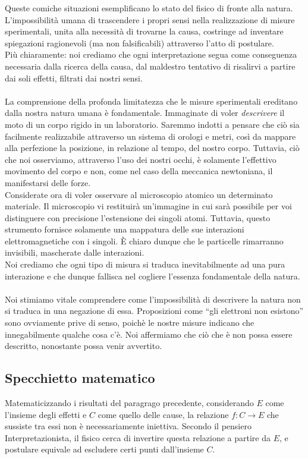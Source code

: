 \documentclass[]{article}
\begin{document}
	Queste comiche situazioni esemplificano lo stato del fisico di fronte alla natura. L'impossibilità umana di trascendere i propri sensi nella realizzazione di misure sperimentali, unita alla necessità di trovarne la causa, costringe ad inventare spiegazioni ragionevoli (ma non falsificabili) attraverso l'atto di postulare. \\
	Più chiaramente: noi crediamo che ogni interpretazione segua come conseguenza necessaria dalla ricerca della causa, dal maldestro tentativo di risalirvi a partire dai soli effetti, filtrati dai nostri sensi.\\
	\\
	La comprensione della profonda limitatezza che le misure sperimentali ereditano dalla nostra natura umana è fondamentale. Immaginate di voler \textit{descrivere} il moto di un corpo rigido in un laboratorio. Saremmo indotti a pensare che ciò sia facilmente realizzabile attraverso un sistema di orologi e metri, così da mappare alla perfezione la posizione, in relazione al tempo, del nostro corpo. Tuttavia, ciò che noi osserviamo, attraverso l'uso dei nostri occhi, è solamente l'effettivo movimento del corpo e non, come nel caso della meccanica newtoniana, il manifestarsi delle forze. \\
	Considerate ora di voler osservare al microscopio atomico un determinato materiale. Il microscopio vi restituirà un'immagine in cui sarà possibile per voi distinguere con precisione l'estensione dei singoli atomi. Tuttavia, questo strumento fornisce solamente una mappatura delle sue interazioni elettromagnetiche con i singoli. \`E chiaro dunque che  le particelle rimarranno invisibili, mascherate dalle interazioni.\\
	Noi crediamo che ogni tipo di misura si traduca inevitabilmente ad una pura interazione e che dunque fallisca nel cogliere l'essenza fondamentale della natura.\\
	\\ 
	Noi stimiamo vitale comprendere come l'impossibilità di descrivere la natura non si traduca in una negazione di essa. Proposizioni come \enquote{gli elettroni non esistono} sono ovviamente prive di senso, poichè le nostre misure indicano che innegabilmente qualche cosa c'è. Noi affermiamo che ciò che è non possa essere descritto, nonostante possa venir avvertito.
	\subsection{Specchietto matematico}
	Matematicizzando i risultati del paragrago precedente, considerando $E$ come l'insieme degli effetti e $C$ come quello delle cause, la relazione $f:C\rightarrow E$ che sussiste tra essi non è necessariamente iniettiva. Secondo il pensiero Interpretazionista, il fisico cerca di invertire questa relazione a partire da $E$, e postulare equivale ad escludere certi punti dall'insieme $C$.
\end{document}
